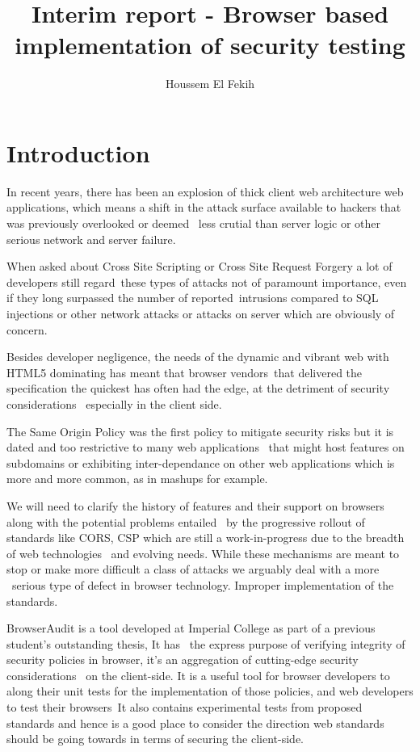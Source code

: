\documentclass[a4paper,12pt]{paper}
\title{Interim report - Browser based implementation of security testing}
\author{Houssem El Fekih}
\begin{document}
\maketitle 
\tableofcontents
\pagebreak
\section{Introduction}

In recent years, there has been an explosion of thick client web architecture web applications,
which means a shift in the attack surface available to hackers that was previously overlooked or deemed \
less crutial than server logic or other serious network and server failure.\

When asked about Cross Site Scripting or Cross Site Request Forgery a lot of developers still regard\
these types of attacks not of paramount importance, even if they long surpassed the number of reported\
intrusions compared to SQL injections or other network attacks or attacks on server which are obviously of concern.\

Besides developer negligence, the needs of the dynamic and vibrant web with HTML5 dominating has meant that browser vendors\
that delivered the specification the quickest has often had the edge, at the detriment of security considerations \
especially in the client side.\

The Same Origin Policy was the first policy to mitigate security risks but it is dated and too restrictive to many web applications \
that might host features on subdomains or exhibiting inter-dependance on other web applications which is more and more common, as in mashups \cite{mashup} for example.\

We will need to clarify the history of features and their support on browsers along with the potential problems entailed \
by the progressive rollout of standards like CORS, CSP which are still a work-in-progress due to the breadth of web technologies \
and evolving needs. While these mechanisms are meant to stop or make more difficult a class of attacks we arguably deal with a more \
serious type of defect in browser technology. Improper implementation of the standards.\

BrowserAudit is a tool developed at Imperial College as part of a previous student's outstanding thesis, It has \
the express purpose of verifying integrity of security policies in browser, it's an aggregation of cutting-edge security considerations \ 
on the client-side. 
It is a useful tool for browser developers to along their unit tests for the implementation of those policies, and web developers to test their browsers\
It also contains experimental tests from proposed standards and hence is a good place to consider the direction web standards should be going towards in terms of securing the client-side.\
\end{document}
